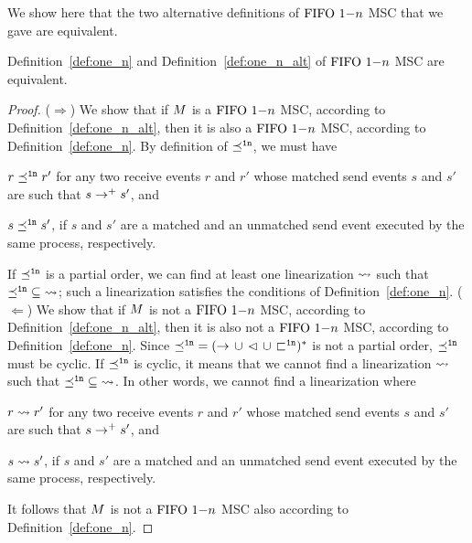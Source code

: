 We show here that the two alternative definitions of $\text{FIFO } 1\mathsf{-}n$ MSC that we gave are equivalent.

\begin{proposition}
    Definition~\ref{def:one_n} and Definition~\ref{def:one_n_alt} of $\text{FIFO } 1\mathsf{-}n$ MSC are equivalent.
\end{proposition}
\begin{proof}
    ($\Rightarrow$)  We show that if $M$ is a $\text{FIFO } 1\mathsf{-}n$ MSC, according to Definition~\ref{def:one_n_alt}, then it is also a $\text{FIFO } 1\mathsf{-}n$ MSC, according to Definition~\ref{def:one_n}. By definition of $\preceq^{\mathtt{1n}}$, we must have 
    \begin{enumerate*}[label={(\roman*)}]
        \item $r \preceq^{\mathtt{1n}} r'$ for any two receive events $r$ and $r'$ whose matched send events $s$ and $s'$ are such that $s \to^+ s'$, and
        \item $s \preceq^{\mathtt{1n}} s'$, if $s$ and $s'$ are a matched and an unmatched send event executed by the same process, respectively.
    \end{enumerate*} 
    If $\preceq^{\mathtt{1n}}$ is a partial order, we can find at least one linearization $\rightsquigarrow$ such that $\preceq^{\mathtt{1n}} \;\subseteq\; \rightsquigarrow$; such a linearization satisfies the conditions of Definition~\ref{def:one_n}.\newline
    ($\Leftarrow$) We show that if $M$ is not a $\text{FIFO } 1\mathsf{-}n$ MSC, according to Definition~\ref{def:one_n_alt}, then it is also not a $\text{FIFO } 1\mathsf{-}n$ MSC, according to Definition~\ref{def:one_n}. Since ${\preceq^{\mathtt{1n}}} = ({\to} \,\cup\, {\lhd} \,\cup\, {\sqsubset^{\mathtt{1n}}})^\ast$ is not a partial order, $\preceq^{\mathtt{1n}}$ must be cyclic. If $\preceq^{\mathtt{1n}}$ is cyclic, it means that we cannot find a linearization $\rightsquigarrow$ such that $\preceq^{\mathtt{1n}} \;\subseteq\; \rightsquigarrow$. In other words, we cannot find a linearization where      
    \begin{enumerate*}[label={(\roman*)}]
        \item $r \rightsquigarrow r'$ for any two receive events $r$ and $r'$ whose matched send events $s$ and $s'$ are such that $s \to^+ s'$, and
        \item $s \rightsquigarrow s'$, if $s$ and $s'$ are a matched and an unmatched send event executed by the same process, respectively.
    \end{enumerate*} 
    It follows that $M$ is not a $\text{FIFO } 1\mathsf{-}n$ MSC also according to Definition~\ref{def:one_n}.
\end{proof}

